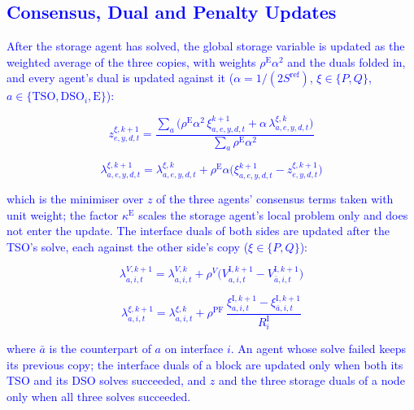 \documentclass[preprint,12pt]{elsarticle}
\begin{document}
\subsection{\textcolor{blue}{Consensus, Dual and Penalty Updates}}
\label{app:admm_updated_updates}

\textcolor{blue}{
    After the storage agent has solved, the global storage variable is updated as the weighted average of the three copies, with weights $\rho^{\text{E}} \alpha^2$ and the duals folded in, and every agent's dual is updated against it ($\alpha = 1/(2 S^{\text{ref}})$, $\xi \in \{P,Q\}$, $a \in \{\text{TSO}, \text{DSO}_i, \text{E}\}$):
}

\textcolor{blue}{
    \begin{equation}
        z^{\xi,k+1}_{e,y,d,t} =
        \frac{\sum_{a} \big( \rho^{\text{E}} \alpha^2\, \xi^{k+1}_{a,e,y,d,t} + \alpha\, \lambda^{\xi,k}_{a,e,y,d,t} \big)}
             {\sum_{a} \rho^{\text{E}} \alpha^2}
        \label{eq:admm_z_update}
    \end{equation}
}

\textcolor{blue}{
    \begin{equation}
        \lambda^{\xi,k+1}_{a,e,y,d,t} = \lambda^{\xi,k}_{a,e,y,d,t} + \rho^{\text{E}} \alpha
        \big( \xi^{k+1}_{a,e,y,d,t} - z^{\xi,k+1}_{e,y,d,t} \big)
    \end{equation}
}

\noindent
\textcolor{blue}{
    which is the minimiser over $z$ of the three agents' consensus terms taken with unit weight; the factor $\kappa^{\text{E}}$ scales the storage agent's local problem only and does not enter the update. The interface duals of both sides are updated after the TSO's solve, each against the other side's copy ($\xi \in \{P,Q\}$):
}

\textcolor{blue}{
    \begin{equation}
        \lambda^{V,k+1}_{a,i,t} = \lambda^{V,k}_{a,i,t} + \rho^{V} \big( V^{\text{I},k+1}_{a,i,t} - V^{\text{I},k+1}_{\bar a,i,t} \big)
        \label{eq:admm_interface_duals}
    \end{equation}
}

\textcolor{blue}{
    \begin{equation}
        \lambda^{\xi,k+1}_{a,i,t} = \lambda^{\xi,k}_{a,i,t} + \rho^{\text{PF}}\,
        \frac{\xi^{\text{I},k+1}_{a,i,t} - \xi^{\text{I},k+1}_{\bar a,i,t}}{R^{\text{I}}_i} 
    \end{equation}
}

\noindent
\textcolor{blue}{
    where $\bar a$ is the counterpart of $a$ on interface $i$. An agent whose solve failed keeps its previous copy; the interface duals of a block are updated only when both its TSO and its DSO solves succeeded, and $z$ and the three storage duals of a node only when all three solves succeeded.
}
\end{document}
